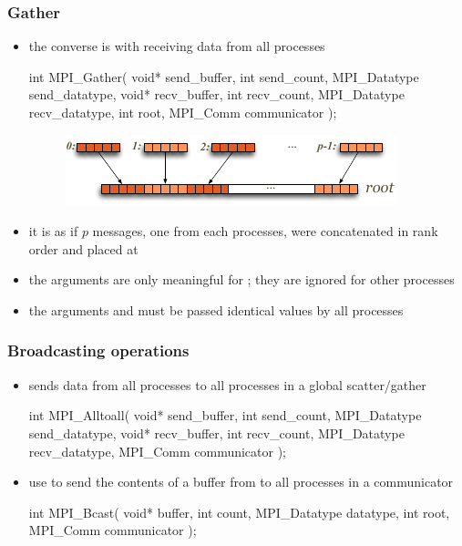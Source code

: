 \begin{frame}[fragile]
%
  \frametitle{Gather}
%
  \begin{itemize}
%
  \item the converse is  with  receiving data from all
    processes
    \begin{C}
int MPI_Gather(
        void* send_buffer, int send_count, MPI_Datatype send_datatype,
        void* recv_buffer, int recv_count, MPI_Datatype recv_datatype,
        int root, MPI_Comm communicator
        );
   \end{C}
   \begin{figure}
     \centering
     \includegraphics[scale=1.0]{figures/mpi-gather.pdf}
   \end{figure}
%
  \item it is as if $p$ messages, one from each processes, were concatenated in rank order and
    placed at 
%
  \item the  arguments are only meaningful for ; they
    are ignored for other processes
%
  \item the arguments  and  must be passed identical
    values by all processes
%
  \end{itemize}
%
\end{frame}

\begin{frame}[fragile]
%
  \frametitle{Broadcasting operations}
%
  \begin{itemize}
%
  \item {} sends data from all processes to all processes in a global
    scatter/gather
    \begin{C}
int MPI_Alltoall(
        void* send_buffer, int send_count, MPI_Datatype send_datatype,
        void* recv_buffer, int recv_count, MPI_Datatype recv_datatype,
        MPI_Comm communicator
        );
   \end{C}
%
 \item use  to send the contents of a buffer from  to all
   processes in a communicator
   \begin{C}
int MPI_Bcast(
        void* buffer, int count, MPI_Datatype datatype,
        int root, MPI_Comm communicator
        );
   \end{C}
%
  \end{itemize}
%
\end{frame}

